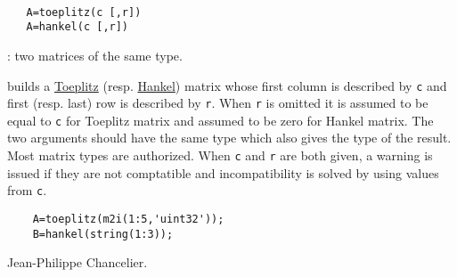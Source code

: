 \begin{mandesc}
  \\ %
\end{mandesc}
\begin{calling_sequence}
\begin{verbatim}
   A=toeplitz(c [,r])   
   A=hankel(c [,r])   
\end{verbatim}
\end{calling_sequence}
\begin{parameters}
  \begin{varlist}
    : two matrices of the same type. 
  \end{varlist}
\end{parameters}
\begin{mandescription}
  builds a \href{http://en.wikipedia.org/wiki/Toeplitz_matrix}{Toeplitz}
  (resp. \href{http://en.wikipedia.org/wiki/Hankel_matrix}{Hankel})
  matrix whose first column is described 
  by \verb+c+ and first (resp. last) row is described by \verb+r+. 
  When \verb+r+ is omitted it is assumed to be equal to \verb+c+ for Toeplitz
  matrix and assumed to be zero for Hankel matrix. 
  The two arguments should have the same type which also gives the type of 
  the result. Most matrix types are authorized. 
  When \verb+c+ and \verb+r+ are both given, a warning is issued if they are 
  not comptatible and incompatibility is solved by using values from \verb+c+. 
\end{mandescription}
\begin{examples}
  \begin{Verbatim}
    A=toeplitz(m2i(1:5,'uint32'));
    B=hankel(string(1:3));
  \end{Verbatim}
\end{examples}
\begin{authors}
  Jean-Philippe Chancelier. 
\end{authors}


